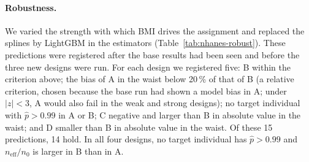 \documentclass[twoside,11pt]{article}
\newcommand{\neff}{n_{\mathrm{eff}}}
\theoremstyle{plain}
\theoremstyle{definition}
\begin{document}
\begin{table}[ht]
\centering
\caption{NHANES, robustness (200 replications each). Mean bias of the DR estimator in the waist (cm) and, in the last two columns, in blood pressure (BP). For B, the registered prediction and the $z$ of the deviation are given in parentheses.}\label{tab:nhanes-robust}
\end{table}

\paragraph{Robustness.} We varied the strength with which BMI drives the assignment and replaced the splines by LightGBM in the estimators (Table~\ref{tab:nhanes-robust}). These predictions were registered after the base results had been seen and before the three new designs were run. For each design we registered five: B within the criterion above; the bias of A in the waist below 20\,\% of that of B (a relative criterion, chosen because the base run had shown a model bias in A; under $|z|<3$, A would also fail in the weak and strong designs); no target individual with $\hat p>0.99$ in A or B; C negative and larger than B in absolute value in the waist; and D smaller than B in absolute value in the waist. Of these 15 predictions, 14 hold. In all four designs, no target individual has $\hat p>0.99$ and $\neff/n_0$ is larger in B than in A.
\end{document}
